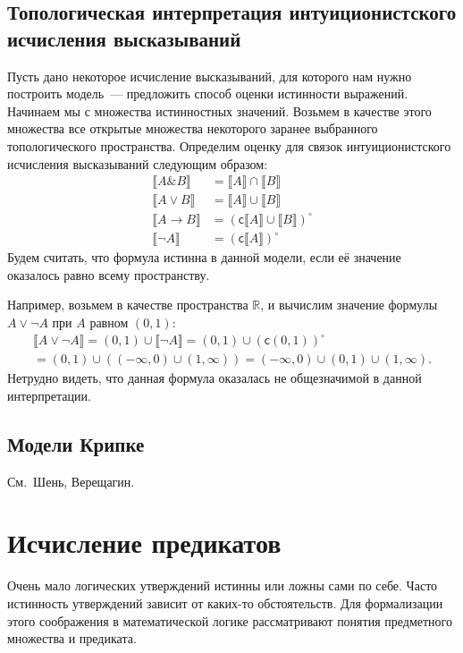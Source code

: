 \documentclass[a4paper,11pt]{article}
\theoremstyle{definition}
\newcommand{\cmpl}{\mathsf{c}}
\newcommand{\amp}{\mathbin{\&}}
\begin{document}
\subsection{Топологическая интерпретация интуиционистского исчисления высказываний}
Пусть дано некоторое исчисление высказываний, для которого нам нужно построить
модель~--- предложить способ оценки истинности выражений. Начинаем мы с
множества истинностных значений. Возьмем в качестве этого множества все
открытые множества некоторого заранее выбранного топологического пространства.
Определим оценку для связок интуиционистского исчисления высказываний следующим
образом:
\begin{align*}
\llbracket A \amp B\rrbracket &= \llbracket A\rrbracket \cap \llbracket B\rrbracket\\
\llbracket A \vee B\rrbracket &= \llbracket A\rrbracket \cup \llbracket B\rrbracket\\
\llbracket A \to B\rrbracket &= (\cmpl\llbracket A\rrbracket \cup \llbracket B\rrbracket)^\circ\\
\llbracket \neg A\rrbracket &= (\cmpl\llbracket A\rrbracket)^\circ
\end{align*}
Будем считать, что формула истинна в данной модели, если её значение оказалось
равно всему пространству.

Например, возьмем в качестве пространства $\mathbb{R}$, и вычислим значение
формулы $A \vee \neg A$ при $A$ равном $(0, 1)$:
\begin{multline*}
\llbracket A\vee\neg A\rrbracket = (0,1)\cup\llbracket\neg A\rrbracket = (0,1)\cup(\cmpl(0,1))^\circ\\
= (0,1)\cup((-\infty,0)\cup(1,\infty)) = (-\infty,0)\cup(0,1)\cup(1,\infty).
\end{multline*}
Нетрудно видеть, что данная формула оказалась не общезначимой в данной
интерпретации.

\subsection{Модели Крипке}
См.\ Шень, Верещагин.

\section{Исчисление предикатов}
Очень мало логических утверждений истинны или ложны сами по себе. Часто
истинность утверждений зависит от каких-то обстоятельств. Для формализации этого
соображения в математической логике рассматривают понятия предметного множества
и предиката.
\end{document}
